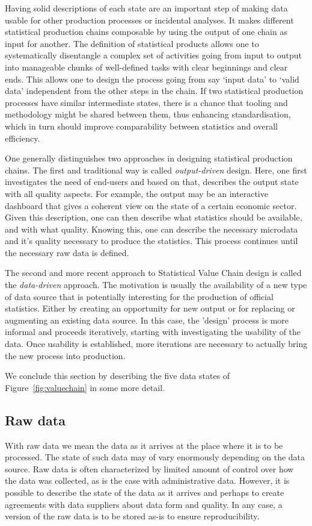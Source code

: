 Having solid descriptions of each state are an important step of making data
usable for other production processes or incidental analyses.  It makes
different statistical production chains composable by using the output of one
chain as input for another.  The definition of statistical products allows one
to systematically disentangle a complex set of activities going from input to
output into manageable chunks of well-defined tasks with clear beginnings and
clear ends. This allows one to design the process going from say `input data'
to `valid data' independent from the other steps in the chain.  If two
statistical production processes have similar intermediate states, there is a
chance that tooling and methodology might be shared between them, thus
enhancing standardisation, which in turn should improve comparability between
statistics and overall efficiency.

One generally distinguishes two approaches in designing statistical production
chains. The first and traditional way is called \emph{output-driven} design.
Here, one first investigates the need of end-users and based on that, describes
the output state with all quality aspects. For example, the output may be an
interactive dashboard that gives a coherent view on the state of a certain
economic sector. Given this description, one can then describe what statistics
should be available, and with what quality.  Knowing this, one can describe the
necessary microdata and it's quality necessary to produce the statistics. This
process continues until the necessary raw data is defined. 

The second and more recent approach to Statistical Value Chain design is called
the \emph{data-driven} approach. The motivation is usually the availability of
a new type of data source that is potentially interesting for the production of
official statistics. Either by creating an opportunity for new output or for
replacing or augmenting an existing data source. In this case, the 'design'
process is more informal and proceeds iteratively, starting with investigating
the usability of the data. Once usability is established, more iterations are
necessary to actually bring the new process into production.

We conclude this section by describing the five data states of
Figure~\ref{fig:valuechain} in some more detail.

\subsection*{Raw data}
With raw data we mean the data as it arrives at the place where it is to be
processed. The state of such data may of vary enormously depending on the data
source.  Raw data is often characterized by limited amount of control over how
the data was collected, as is the case with administrative data. However, it is
possible to describe the state of the data as it arrives and perhaps to create
agreements with data suppliers about data form and quality. In any case,
a version of the raw data is to be stored as-is to ensure reproducibility.

